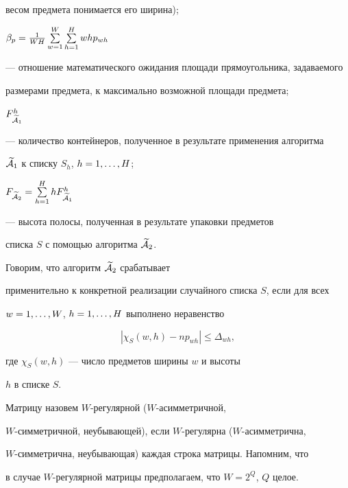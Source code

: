 весом предмета понимается его ширина);





$\beta_{p}=\frac{1}{WH}\sum\limits^W_{w=1}\sum\limits^H_{h=1} whp_{wh}$


--- отношение математического ожидания площади прямоугольника, задаваемого 


размерами предмета, к максимально возможной площади предмета;





$F_{\widetilde {\cal A}_{1}}^{h} $


--- количество контейнеров, полученное в результате применения алгоритма


$\widetilde {\cal A}_{1}$ к списку $S_{h}$, $h=1,\dotsc,H$;





$F_{\widetilde {\cal A}_{2}}=


\SH hF_{\widetilde {\cal A}_{1}}^{h} $


--- высота полосы, полученная в результате упаковки предметов


списка $S$ с помощью алгоритма $\widetilde {\cal A}_{2}$.





Говорим, что алгоритм $\widetilde {\cal A}_{2}$ срабатывает 


применительно к конкретной реализации случайного списка $S$, если для всех


$w=1,\dotsc,W$, $h=1,\dotsc,H$ выполнено неравенство


\begin{equation}


\label{e15}


|\chi_S(w,h)-np_{wh}|\le \Delta_{wh},


\end{equation}


где $\chi_S(w,h)$ --- число предметов ширины $w$ и высоты


$h$ в списке $S$.





Матрицу назовем $W$-регулярной ($W$-асимметричной,


$W$-симметричной, неубывающей), если $W$-регулярна ($W$-асимметрична, 


$W$-симметрична, неубывающая) каждая строка матрицы. Напомним, что


в случае $W$-регулярной матрицы предполагаем, что $W=2^{Q}$, $Q$ целое.





